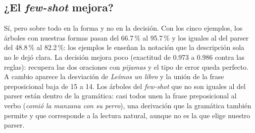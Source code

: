 \subsection{¿El \emph{few-shot} mejora?}

Sí, pero sobre todo en la forma y no en la decisión. Con los cinco ejemplos, los árboles con
nuestras formas pasan del 66.7\,\% al 95.7\,\% y los iguales al del parser del 48.8\,\% al
82.2\,\%: los ejemplos le enseñan la notación que la descripción sola no le dejó clara. La
decisión mejora poco (exactitud de 0.973 a 0.986 contra las reglas): recupera las dos oraciones
con \emph{pijamas} y el tipo de error queda perfecto. A cambio aparece la desviación de
\emph{Leímos un libro} y la unión de la frase preposicional baja de 15 a 14. Los árboles del
\emph{few-shot} que no son iguales al del parser están dentro de la gramática: casi todos unen
la frase preposicional al verbo (\emph{comió la manzana con su perro}), una derivación que la
gramática también permite y que corresponde a la lectura natural, aunque no es la que elige
nuestro parser.
